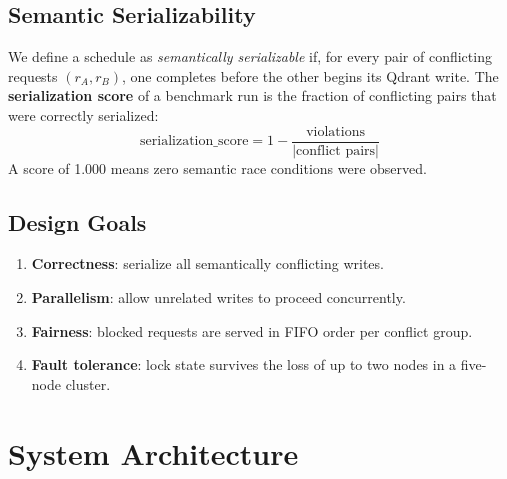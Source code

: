 \documentclass[sigconf]{acmart}
\begin{document}
\subsection{Semantic Serializability}

We define a schedule as \emph{semantically serializable} if, for every pair of
conflicting requests $(r_A, r_B)$, one completes before the other begins its Qdrant write.
The \textbf{serialization score} of a benchmark run is the fraction of conflicting pairs
that were correctly serialized:
\[
  \text{serialization\_score} = 1 - \frac{\text{violations}}{|\text{conflict pairs}|}
\]
A score of 1.000 means zero semantic race conditions were observed.

\subsection{Design Goals}

\begin{enumerate}
\item \textbf{Correctness}: serialize all semantically conflicting writes.
\item \textbf{Parallelism}: allow unrelated writes to proceed concurrently.
\item \textbf{Fairness}: blocked requests are served in FIFO order per conflict group.
\item \textbf{Fault tolerance}: lock state survives the loss of up to two nodes in a
  five-node cluster.
\end{enumerate}

\section{System Architecture}
\label{sec:arch}
\end{document}
